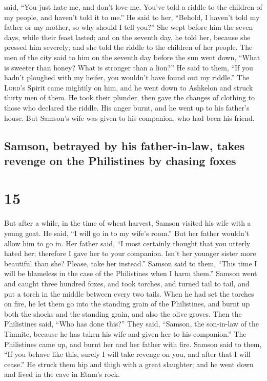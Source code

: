 said, ``You just hate me, and don't love me. You've told a riddle to the
children of my people, and haven't told it to me.'' He said to her,
``Behold, I haven't told my father or my mother, so why should I tell
you?''  She wept before him the seven days, while their
feast lasted; and on the seventh day, he told her, because she pressed
him severely; and she told the riddle to the children of her people.
 The men of the city said to him on the seventh day
before the sun went down, ``What is sweeter than honey? What is stronger
than a lion?'' He said to them, ``If you hadn't ploughed with my heifer,
you wouldn't have found out my riddle.''  The
\textsc{Lord}'s Spirit came mightily on him, and he went down to
Ashkelon and struck thirty men of them. He took their plunder, then gave
the changes of clothing to those who declared the riddle. His anger
burnt, and he went up to his father's house.  But
Samson's wife was given to his companion, who had been his friend.

\hypertarget{samson-betrayed-by-his-father-in-law-takes-revenge-on-the-philistines-by-chasing-foxes}{%
\subsection{Samson, betrayed by his father-in-law, takes revenge on the
Philistines by chasing
foxes}\label{samson-betrayed-by-his-father-in-law-takes-revenge-on-the-philistines-by-chasing-foxes}}

\hypertarget{section-14}{%
\section{15}\label{section-14}}

 But after a while, in the time of wheat harvest, Samson
visited his wife with a young goat. He said, ``I will go in to my wife's
room.'' But her father wouldn't allow him to go in.  Her
father said, ``I most certainly thought that you utterly hated her;
therefore I gave her to your companion. Isn't her younger sister more
beautiful than she? Please, take her instead.''  Samson
said to them, ``This time I will be blameless in the case of the
Philistines when I harm them.''  Samson went and caught
three hundred foxes, and took torches, and turned tail to tail, and put
a torch in the middle between every two tails.  When he
had set the torches on fire, he let them go into the standing grain of
the Philistines, and burnt up both the shocks and the standing grain,
and also the olive groves.  Then the Philistines said,
``Who has done this?'' They said, ``Samson, the son-in-law of the
Timnite, because he has taken his wife and given her to his companion.''
The Philistines came up, and burnt her and her father with fire.
 Samson said to them, ``If you behave like this, surely I
will take revenge on you, and after that I will cease.'' 
He struck them hip and thigh with a great slaughter; and he went down
and lived in the cave in Etam's rock.

